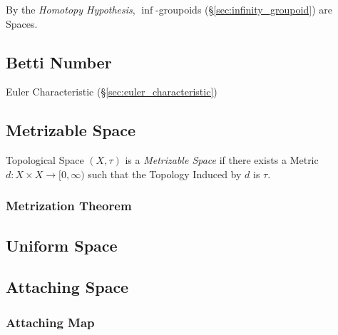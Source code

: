 By the \emph{Homotopy Hypothesis}, $\inf$-groupoids
(\S\ref{sec:infinity_groupoid}) are Spaces.



\subsection{Betti Number}\label{sec:betti_number}

Euler Characteristic (\S\ref{sec:euler_characteristic})



\subsection{Metrizable Space}\label{sec:metrizable_space}

Topological Space $(X, \tau)$ is a \emph{Metrizable Space} if there
exists a Metric $d : X \times X \rightarrow [0, \infty)$ such that the
  Topology Induced by $d$ is $\tau$.



\subsubsection{Metrization Theorem}\label{sec:metrization_theorem}



\subsection{Uniform Space}\label{sec:uniform_space}

\subsection{Attaching Space}\label{sec:attaching_space}

\subsubsection{Attaching Map}\label{sec:attaching_map}



